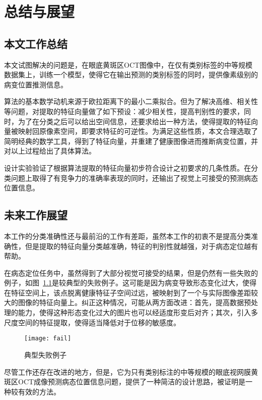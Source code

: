 \chapter{总结与展望}

\section{本文工作总结}
    本文试图解决的问题是，在眼底黄斑区OCT图像中，在仅有类别标签的中等规模数据集上，训练一个模型，使得它在输出预测的类别标签的同时，提供像素级别的病变位置推测信息。

    算法的基本数学动机来源于欧拉距离下的最小二乘拟合。但为了解决高维、相关性等问题，对提取的特征向量做了如下预设：减少相关性，提高判别性的要求，同时，为了在分类之后可以给出空间信息，还要求给出一种方法，使得提取的特征向量被映射回原像素空间，即要求特征的可逆性。为满足这些性质，本文合理选取了简明经典的数学工具，得到了特征向量，并重建了健康图像进而推断病变位置，并对以上过程给出了具体算法。

    设计实验验证了根据算法提取的特征向量初步符合设计之初要求的几条性质。在分类问题上取得了有竞争力的准确率表现的同时，还输出了视觉上可接受的预测病态位置信息。


\section{未来工作展望}
    本工作的分类准确性还与最前沿的工作有差距，虽然本工作的初衷不是提高分类准确性，但是提取的特征向量分类越准确，特征的判别性就越强，对于病态定位越有帮助。

    在病态定位任务中，虽然得到了大部分视觉可接受的结果，但是仍然有一些失败的例子，如图~\ref{fig:fail}是较典型的失败例子。这可能是因为病变导致形态变化过大，使得在特征空间上，该点脱离健康特征子空间过远，被映射到了一个与实际图像差距较大的图像的特征向量上。纠正这种情况，可能从两方面改进：首先，提高数据预处理的能力，使得这种形态变化过大的图片也可以经适度形变后对齐；其次，引入多尺度空间的特征提取，使得适当降低对于位移的敏感度。

    \begin{figure}[H] %
      \centering
      \texttt{[image: fail]}
      \caption{典型失败例子}
      \label{fig:fail}
    \end{figure}

    尽管工作还存在改进的地方，但是，它为只有类别标注的中等规模的眼底视网膜黄斑区OCT成像预测病态位置信息问题，提供了一种简洁的设计思路，被证明是一种较有效的方法。

